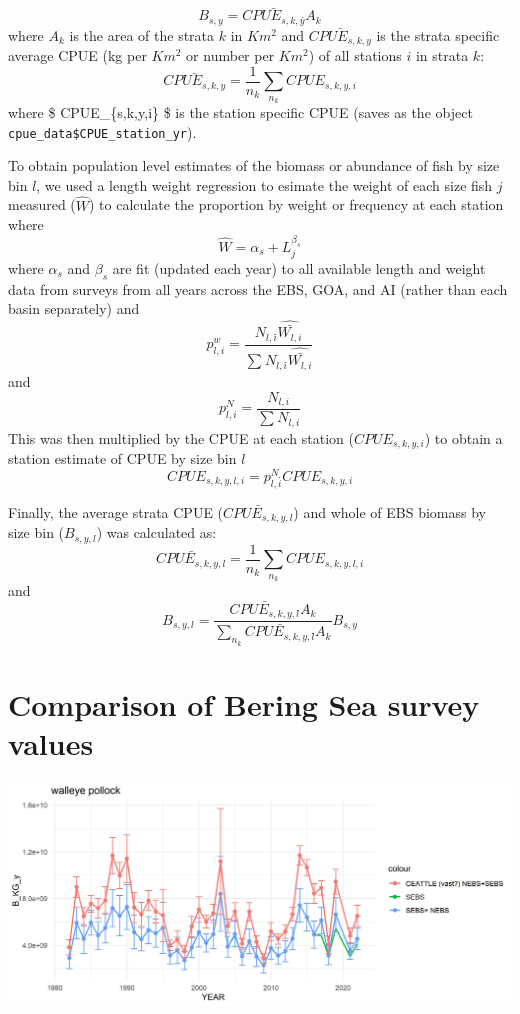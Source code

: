 \documentclass[
]{article}
\begin{document}
\[B_{s,y} =  \bar{CPUE_{s,k,y}} \dot{}A_{k}\] where \(A_{k}\) is the
area of the strata \(k\) in \(Km^2\) and \(\bar{CPUE_{s,k,y}}\) is the
strata specific average CPUE (kg per \(Km^2\) or number per \(Km^2\)) of
all stations \(i\) in strata \(k\):
\[\bar{CPUE_{s,k,y}} = \frac{1}{n_k}\dot{}\sum_{n_k}{CPUE_{s,k,y,i}}\]
where \$ CPUE\_\{s,k,y,i\} \$ is the station specific CPUE (saves as the
object \texttt{cpue\_data\$CPUE\_station\_yr}).

To obtain population level estimates of the biomass or abundance of fish
by size bin \(l\), we used a length weight regression to esimate the
weight of each size fish \(j\) measured (\(\hat{W}\)) to calculate the
proportion by weight or frequency at each station where
\[\hat{W} = \alpha_s+L_j^{\beta_s} \] where \(\alpha_s\) and \(\beta_s\)
are fit (updated each year) to all available length and weight data from
surveys from all years across the EBS, GOA, and AI (rather than each
basin separately) and
\[p^w_{l,i} = \frac{N_{l,i}\dot{}\hat{\bar{W_{l,i}}}}{\sum_{}{N_{l,i}\dot{}\hat{\bar{W_{l,i}}}}}\]
and \[p^N_{l,i} = \frac{N_{l,i}}{\sum_{}{N_{l,i}}}\] This was then
multiplied by the CPUE at each station (\(CPUE_{s,k,y,i}\)) to obtain a
station estimate of CPUE by size bin \(l\)
\[CPUE_{s,k,y,l,i} = p^N_{l,i}\dot{}CPUE_{s,k,y,i}\]

Finally, the average strata CPUE (\(\bar{CPUE_{s,k,y,l}}\)) and whole of
EBS biomass by size bin (\(B_{s,y,l}\)) was calculated as:
\[\bar{CPUE_{s,k,y,l}} = \frac{1}{n_k}\dot{}\sum_{n_k}{CPUE_{s,k,y,l,i}}\]
and
\[B_{s,y,l}= \frac{\bar{CPUE_{s,k,y,l}}\dot{}A_{k}}{\sum_{n_k}{\bar{CPUE_{s,k,y,l}}\dot{}A_{k}}}\dot{}B_{s,y}\]

\hypertarget{comparison-of-bering-sea-survey-values}{%
\section{Comparison of Bering Sea survey
values}\label{comparison-of-bering-sea-survey-values}}

\includegraphics{figs/plk_srvy.jpg}
\end{document}
